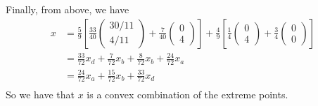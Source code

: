 \documentclass{article}
\begin{document}
Finally, from above, we have
\begin{align*}
    x &= \frac{5}{9}\left[\frac{33}{40}\begin{pmatrix}
        30/11\\
        4/11
    \end{pmatrix} + \frac{7}{40}\begin{pmatrix}
        0\\
        4
    \end{pmatrix}
    \right] + \frac{4}{9}\left[\frac{1}{4}\begin{pmatrix}
        0\\
        4
    \end{pmatrix} + \frac{3}{4}\begin{pmatrix}
        0\\
        0
    \end{pmatrix} \right] \\
    &= \frac{33}{72}x_d + \frac{7}{72}x_b + \frac{8}{72}x_b + \frac{24}{72}x_a\\
    &= \frac{24}{72}x_a + \frac{15}{72}x_b + \frac{33}{72}x_d\\
\end{align*}
So we have that $x$ is a convex combination of the extreme points.
\end{document}
